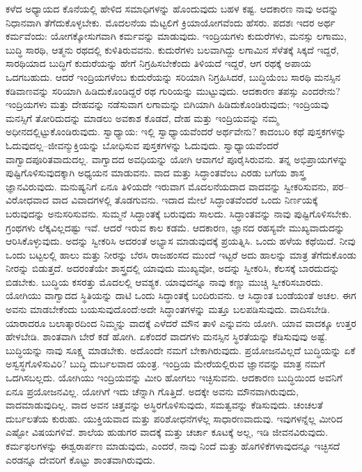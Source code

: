 ಕಳೆದ ಅಧ್ಯಾಯದ ಕೊನೆಯಲ್ಲಿ ಹೇಳಿದ ಸಮಾಧಿಗಳನ್ನು ಹೊಂದುವುದು ಬಹಳ ಕಷ್ಟ. ಆದಕಾರಣ ನಾವು ಅದನ್ನು ನಿಧಾನವಾಗಿ ತೆಗೆದುಕೊಳ್ಳಬೇಕು. ಮೊದಲನೆಯ ಮೆಟ್ಟಲಿಗೆ ಕ್ರಿಯಾಯೋಗವೆಂದು ಹೆಸರು. ಪದಶಃ ಇದರ ಅರ್ಥ ಕರ್ಮವೆಂದು: ಯೋಗಕ್ಕೋಸುಗವಾಗಿ ಕರ್ಮವನ್ನು ಮಾಡುವುದು. ಇಂದ್ರಿಯಗಳು ಕುದುರೆಗಳು, ಮನಸ್ಸು ಲಗಾಮು, ಬುದ್ಧಿ ಸಾರಥಿ, ಆತ್ಮನು ರಥದಲ್ಲಿ ಕುಳಿತಿರುವವನು. ಕುದುರೆಗಳು ಬಲವಾಗಿದ್ದು ಲಗಾಮಿನ ಸೆಳೆತಕ್ಕೆ ಸಿಕ್ಕದೆ ಇದ್ದರೆ, ಸಾರಥಿಯಾದ ಬುದ್ಧಿಗೆ ಕುದುರೆಯನ್ನು ಹೇಗೆ ನಿಗ್ರಹಿಸಬೇಕೆಂದು ತಿಳಿಯದೆ ಇದ್ದರೆ, ಆಗ ರಥಕ್ಕೆ ಅಪಾಯ ಒದಗಬಹುದು. ಆದರೆ ಇಂದ್ರಿಯಗಳೆಂಬ ಕುದುರೆಯನ್ನು ಸರಿಯಾಗಿ ನಿಗ್ರಹಿಸಿದರೆ, ಬುದ್ಧಿಯೆಂಬ ಸಾರಥಿ ಮನಸ್ಸಿನ ಕಡಿವಾಣವನ್ನು ಸರಿಯಾಗಿ ಹಿಡಿದುಕೊಂಡಿದ್ದರೆ ರಥ ಗುರಿಯನ್ನು ಮುಟ್ಟುವುದು. ಆದಕಾರಣ ತಪಸ್ಸು ಎಂದರೇನು? ಇಂದ್ರಿಯಗಳು ಮತ್ತು ದೇಹವನ್ನು ನಡೆಸುವಾಗ ಲಗಾಮನ್ನು ಬಿಗಿಯಾಗಿ ಹಿಡಿದುಕೊಂಡಿರುವುದು; ಇಂದ್ರಿಯವು ಮನಸ್ಸಿಗೆ ತೋರಿದುದನ್ನು ಮಾಡಲು ಅವಕಾಶ ಕೊಡದೆ, ದೇಹ ಮತ್ತು ಇಂದ್ರಿಯವನ್ನು ನಮ್ಮ ಅಧೀನದಲ್ಲಿಟ್ಟುಕೊಂಡಿರುವುದು. ಸ್ವಾಧ್ಯಾಯ: ಇಲ್ಲಿ ಸ್ವಾಧ್ಯಾಯವೆಂದರೆ ಅರ್ಥವೇನು? ಕಾದಂಬರಿ ಕಥೆ ಪುಸ್ತಕಗಳನ್ನು ಓದುವುದಲ್ಲ–ಜೀವನ್ಮುಕ್ತಿಯನ್ನು ಬೋಧಿಸುವ ಪುಸ್ತಕಗಳನ್ನು ಓದುವುದು. ಸ್ವಾಧ್ಯಾಯವೆಂದರೆ ವಾಗ್ವಾದಪೂರಿತವಾದುದಲ್ಲ. ವಾಗ್ವಾದದ ಅವಧಿಯನ್ನು ಯೋಗಿ ಆವಾಗಲೆ ಪೂರೈಸಿರುವನು. ತನ್ನ ಅಭಿಪ್ರಾಯಗಳನ್ನು ಪುಷ್ಟಿಗೊಳಿಸುವುದಕ್ಕಾಗಿ ಅಧ್ಯಯನ ಮಾಡುವನು. ವಾದ ಮತ್ತು ಸಿದ್ಧಾಂತವೆಂಬ ಎರಡು ಬಗೆಯ ಶಾಸ್ತ್ರ ಜ್ಞಾನವಿರುವುದು. ಮನುಷ್ಯನಿಗೆ ಏನೂ ತಿಳಿಯದೇ ಇರುವಾಗ ಮೊದಲನೆಯದಾದ ವಾದವನ್ನು ಸ್ವೀಕರಿಸುವನು, ಪರ–ವಿರೋಧವಾದ ವಾದ ವಿವಾದಗಳಲ್ಲಿ ತೊಡಗುವನು. ಇದಾದ ಮೇಲೆ ಸಿದ್ಧಾಂತವೆಂದರೆ ಒಂದು ನಿರ್ಣಯಕ್ಕೆ ಬರುವುದನ್ನು ಅನುಸರಿಸುವನು. ಸುಮ್ಮನೆ ಸಿದ್ಧಾಂತಕ್ಕೆ ಬರುವುದು ಸಾಲದು. ಸಿದ್ಧಾಂತವನ್ನು ನಾವು ಪುಷ್ಟಿಗೊಳಿಸಬೇಕು. ಗ್ರಂಥಗಳು ಲೆಕ್ಕವಿಲ್ಲದಷ್ಟು ಇವೆ. ಆದರೆ ಇರುವ ಕಾಲ ಕಡಮೆ. ಆದಕಾರಣ, ಜ್ಞಾನದ ರಹಸ್ಯವೇ ಮುಖ್ಯವಾದುದನ್ನು ಆರಿಸಿಕೊಳ್ಳುವುದು. ಅದನ್ನು ಸ್ವೀಕರಿಸಿ ಅದರಂತೆ ಅಭ್ಯಾಸ ಮಾಡುವುದಕ್ಕೆ ಪ್ರಯತ್ನಿಸಿ. ಒಂದು ಹಳೆಯ ಕಥೆಯಿದೆ. ನೀವು ಒಂದು ಬಟ್ಟಲಲ್ಲಿ ಹಾಲು ಮತ್ತು ನೀರನ್ನು ಬೆರಸಿ ರಾಜಹಂಸದ ಮುಂದೆ ಇಟ್ಟರೆ ಅದು ಹಾಲನ್ನು ಮಾತ್ರ ತೆಗೆದುಕೊಂಡು ನೀರನ್ನು ಬಿಡುತ್ತದೆ. ಅದರಂತೆಯೇ ಶಾಸ್ತ್ರದಲ್ಲಿ ಯಾವುದು ಮುಖ್ಯವೋ, ಅದನ್ನು ಸ್ವೀಕರಿಸಿ, ಕೆಲಸಕ್ಕೆ ಬಾರದುದನ್ನು ಬಿಡಬೇಕು. ಬುದ್ಧಿಯ ಕಸರತ್ತು ಮೊದಲಲ್ಲಿ ಆವಶ್ಯಕ. ಯಾವುದನ್ನೂ ನಾವು ಕಣ್ಣು ಮುಚ್ಚಿ ಸ್ವೀಕರಿಸಬಾರದು. ಯೋಗಿಯು ವಾಗ್ವಾದದ ಸ್ಥಿತಿಯನ್ನು ದಾಟಿ ಒಂದು ಸಿದ್ಧಾಂತಕ್ಕೆ ಬಂದಿರುವನು. ಆ ಸಿದ್ಧಾಂತ ಬಂಡೆಯಂತೆ ಅಚಲ. ಈಗ ಅವನು ಮಾಡಬೇಕೆಂದು ಬಯಸುವುದೊಂದೆ:ಅದೇ ಸಿದ್ಧಾಂತಗಳನ್ನು ಮತ್ತೂ ಬಲಪಡಿಸುವುದು. ವಾದಿಸಬೇಡಿ. ಯಾರಾದರೂ ಬಲಾತ್ಕಾರದಿಂದ ನಿಮ್ಮನ್ನು ವಾದಕ್ಕೆ ಎಳೆದರೆ ಮೌನ ತಾಳಿ ಎನ್ನುವನು ಯೋಗಿ. ಯಾವ ವಾದಕ್ಕೂ ಉತ್ತರ ಹೇಳಬೇಡಿ. ಶಾಂತವಾಗಿ ಬೇರೆ ಕಡೆ ಹೋಗಿ. ಏಕೆಂದರೆ ವಾದಗಳು ಮನಸ್ಸಿನ ಸ್ಥಿರತೆಯನ್ನು ಕೆಡಿಸುವುವು ಅಷ್ಟೆ. ಬುದ್ಧಿಯನ್ನು ನಾವು ಸೂಕ್ಷ್ಮ ಮಾಡಬೇಕು. ಅದೊಂದೇ ನಮಗೆ ಬೇಕಾಗಿರುವುದು. ಪ್ರಯೋಜನವಿಲ್ಲದೆ ಬುದ್ಧಿಯನ್ನು ಏಕೆ ಅಸ್ವಸ್ಥಗೊಳಿಸುವಿರಿ? ಬುದ್ಧಿ ದುರ್ಬಲವಾದ ಯಂತ್ರ. ಇಂದ್ರಿಯ ಮೇರೆಯಲ್ಲಿರುವ ಜ್ಞಾನವನ್ನು ಮಾತ್ರ ನಮಗೆ ಒದಗಿಸಬಲ್ಲದು. ಯೋಗಿಯು ಇಂದ್ರಿಯವನ್ನು ಮೀರಿ ಹೋಗಲು ಇಚ್ಛಿಸುವನು. ಆದಕಾರಣ ಬುದ್ಧಿಯಿಂದ ಅವನಿಗೆ ಏನೂ ಪ್ರಯೋಜನವಿಲ್ಲ. ಯೋಗಿಗೆ ಇದು ಚೆನ್ನಾಗಿ ಗೊತ್ತಿದೆ. ಅದಕ್ಕೇ ಅವನು ಮೌನವಾಗಿರುವುದು, ವಾದಮಾಡುವುದಿಲ್ಲ. ವಾದ ಅವನ ಚಿತ್ತವನ್ನು ಅಸ್ಥಿರಗೊಳಿಸುವುದು, ಸಮತ್ವವನ್ನು ಕೆಡಿಸುವುದು. ಚಂಚಲತೆ ದುರ್ಬಲತೆಯ ಕುರುಹು. ಯುಕ್ತಿಯವಾದ ಮತ್ತು ಪರಿಶೋಧನೆಗಳೆಲ್ಲ ಸಾಧಾರಣವಾದುವು. ಇವುಗಳನ್ನೆಲ್ಲ ಮೀರಿದ ಎಷ್ಟೋ ವಿಷಯಗಳಿವೆ. ಶಾಲೆಯ ಹುಡುಗರ ವಾದಕ್ಕೆ ಮತ್ತು ಚರ್ಚಾ ಕೂಟಕ್ಕೆ ಅಲ್ಲ, ಇಡಿ ಜೀವನವಿರುವುದು. ಕರ್ಮಫಲಗಳನ್ನು ಈಶ್ವರಾರ್ಪಣ ಮಾಡುವುದು, ಎಂದರೆ, ನಾವು ನಿಂದೆ ಮತ್ತು ಹೊಗಳಿಕೆಗಳಾವುದನ್ನೂ ಇಚ್ಛಿಸದೆ ಎರಡನ್ನೂ ದೇವರಿಗೆ ಕೊಟ್ಟು ಶಾಂತವಾಗಿರುವುದು. 

